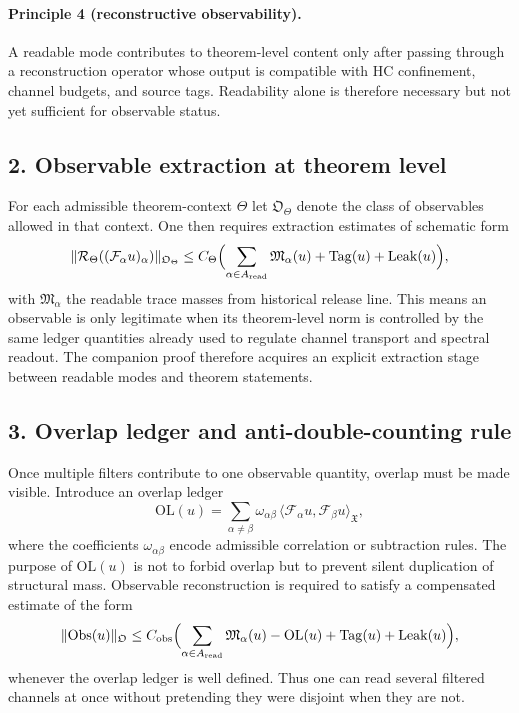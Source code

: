 \documentclass[12pt,a4paper]{article}
\DeclareRobustCommand{\QSCver}[1]{archival stage}
\renewcommand{\QSCver}[1]{historical release line}
\begin{document}
\paragraph{Principle 4 (reconstructive observability).}
A readable mode contributes to theorem-level content only after passing through a
reconstruction operator whose output is compatible with HC confinement, channel
budgets, and source tags. Readability alone is therefore necessary but not yet
sufficient for observable status.

\subsection*{2. Observable extraction at theorem level}
For each admissible theorem-context $\Theta$ let $\mathfrak O_\Theta$ denote the class
of observables allowed in that context. One then requires extraction estimates of
schematic form
\[
\|\mathcal R_\Theta((\mathcal F_\alpha u)_\alpha)\|_{\mathfrak O_\Theta}
\le C_\Theta
\Bigl(
\sum_{\alpha\in A_{\mathrm{read}}} \mathfrak M_\alpha(u)
+ \mathrm{Tag}(u)+\mathrm{Leak}(u)
\Bigr),
\]
with $\mathfrak M_\alpha$ the readable trace masses from \QSCver{v2.9.0}. This means an
observable is only legitimate when its theorem-level norm is controlled by the same
ledger quantities already used to regulate channel transport and spectral readout.
The companion proof therefore acquires an explicit extraction stage between readable
modes and theorem statements.

\subsection*{3. Overlap ledger and anti-double-counting rule}
Once multiple filters contribute to one observable quantity, overlap must be made
visible. Introduce an overlap ledger
\[
\mathrm{OL}(u)= \sum_{\alpha\neq\beta}
\omega_{\alpha\beta}\,\langle \mathcal F_\alpha u,\mathcal F_\beta u\rangle_{\mathfrak X},
\]
where the coefficients $\omega_{\alpha\beta}$ encode admissible correlation or
subtraction rules. The purpose of $\mathrm{OL}(u)$ is not to forbid overlap but to
prevent silent duplication of structural mass. Observable reconstruction is required
to satisfy a compensated estimate of the form
\[
\|\mathrm{Obs}(u)\|_{\mathfrak O}
\le C_{\mathrm{obs}}
\Bigl(
\sum_{\alpha\in A_{\mathrm{read}}} \mathfrak M_\alpha(u)
- \mathrm{OL}(u)
+ \mathrm{Tag}(u)+\mathrm{Leak}(u)
\Bigr),
\]
whenever the overlap ledger is well defined. Thus one can read several filtered
channels at once without pretending they were disjoint when they are not.
\end{document}
